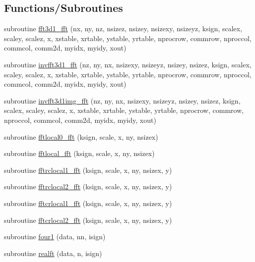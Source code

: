 \subsection*{Functions/\+Subroutines}
\begin{DoxyCompactItemize}
\item 
subroutine \mbox{\hyperlink{namespacefftclass_acef38aed3ece8d2c1120ce0004e6297e}{fft3d1\+\_\+fft}} (nx, ny, nz, nsizez, nsizey, nsizexy, nsizeyz, ksign, scalex, scaley, scalez, x, xstable, xrtable, ystable, yrtable, nprocrow, commrow, nproccol, commcol, comm2d, myidx, myidy, xout)
\item 
subroutine \mbox{\hyperlink{namespacefftclass_a21e8a7bd2877ec439bc4f0e0bc0e4681}{invfft3d1\+\_\+fft}} (nz, ny, nx, nsizexy, nsizeyz, nsizey, nsizez, ksign, scalex, scaley, scalez, x, xstable, xrtable, ystable, yrtable, nprocrow, commrow, nproccol, commcol, comm2d, myidx, myidy, xout)
\item 
subroutine \mbox{\hyperlink{namespacefftclass_a374c599138aeca237d4c303a07a470ee}{invfft3d1img\+\_\+fft}} (nz, ny, nx, nsizexy, nsizeyz, nsizey, nsizez, ksign, scalex, scaley, scalez, x, xstable, xrtable, ystable, yrtable, nprocrow, commrow, nproccol, commcol, comm2d, myidx, myidy, xout)
\item 
subroutine \mbox{\hyperlink{namespacefftclass_a501325267c1425bfece04a18e20efe31}{fftlocal0\+\_\+fft}} (ksign, scale, x, ny, nsizex)
\item 
subroutine \mbox{\hyperlink{namespacefftclass_aa64d94b8c8578b384955207a409a2445}{fftlocal\+\_\+fft}} (ksign, scale, x, ny, nsizex)
\item 
subroutine \mbox{\hyperlink{namespacefftclass_af33a24fc1bf4d5763c335c0cef247e3c}{fftrclocal1\+\_\+fft}} (ksign, scale, x, ny, nsizex, y)
\item 
subroutine \mbox{\hyperlink{namespacefftclass_a83a1c8ccf853ae07fdfc5a80e1e244d1}{fftrclocal2\+\_\+fft}} (ksign, scale, x, ny, nsizex, y)
\item 
subroutine \mbox{\hyperlink{namespacefftclass_a25ecfa928dd28501b9c251c1e887996b}{fftcrlocal1\+\_\+fft}} (ksign, scale, x, ny, nsizex, y)
\item 
subroutine \mbox{\hyperlink{namespacefftclass_a62d05d7b0980c823708d03f4a1520c1e}{fftcrlocal2\+\_\+fft}} (ksign, scale, x, ny, nsizex, y)
\item 
subroutine \mbox{\hyperlink{namespacefftclass_a4597d420a1363f9fd0b652472d7caf52}{four1}} (data, nn, isign)
\item 
subroutine \mbox{\hyperlink{namespacefftclass_a1aec6e8023ec23ff926a64c54c93ee1e}{realft}} (data, n, isign)

\end{DoxyCompactItemize}
